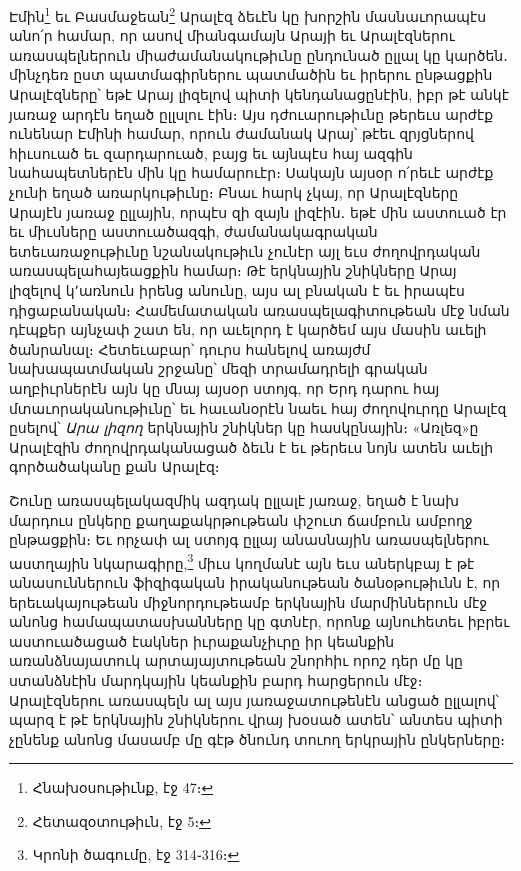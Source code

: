 \documentclass{article}
\begin{document}
{Էմին\footnote{Հնախօսութիւնք, էջ 47։} եւ Բասմաջեան\footnote{Հետազօտութիւն, էջ 5։} Արալէզ ձեւէն կը խորշին մասնաւորապէս անո՛ր համար, որ ասով միանգամայն Արայի եւ Արալէզներու առասպելներուն միաժամանակութիւնը ընդունած ըլլալ կը կարծեն․ մինչդեռ ըստ պատմագիրներու պատմածին եւ իրերու ընթացքին Արալէզները՝ եթէ Արայ լիզելով պիտի կենդանացընէին, իբր թէ անկէ յառաջ արդէն եղած ըլլսլու էին։ Այս դժուարութիւնը թերեւս արժէք ունենար Էմինի համար, որուն ժամանակ Արայ՝ թէեւ զրյցներով հիւսուած եւ զարդարուած, բայց եւ այնպէս հայ ազգին նահապետներէն մին կը համարուէր։ Սակայն այսօր ո՛րեւէ արժէք չունի եղած առարկութիւնը։ Բնաւ հարկ չկայ, որ Արալէզները Արայէն յառաջ ըլլային, որպէս զի զայն լիզէին․ եթէ մին աստուած էր եւ միւսները աստուածազգի, ժամանակագրական ետեւառաջութիւնը նշանակութիւն չունէր այլ եւս ժողովրդական առասպելահայեացքին համար։ Թէ երկնային շնիկները Արայ լիզելով կ՚առնուն իրենց անունը, այս ալ բնական է եւ իրապէս դիցաբանական։ Համեմատական առասպելագիտութեան մէջ նման դէպքեր այնչափ շատ են, որ աւելորդ է կարծեմ այս մասին աւելի ծանրանալ։ Հետեւաբար՝ դուրս հանելով առայժմ նախապատմական շրջանը՝ մեզի տրամադրելի գրական աղբիւրներէն այն կը մնայ այսօր ստոյգ, որ Երդ դարու հայ մտաւորականութիւնը՝ եւ հաւանօրէն նաեւ հայ ժողովուրդը Արալէզ ըսելով՝ \emph{Արա լիզող} երկնային շնիկներ կը հասկընային։ «Առլեզ»ը Արալէզին ժողովրդականացած ձեւն է եւ թերեւս նոյն ատեն աւելի գործածականը քան Արալէզ։

Շունը առասպելակազմիկ ազդակ ըլլալէ յառաջ, եղած է նախ մարդուս ընկերը քաղաքակրթութեան փշուտ ճամբուն ամբողջ ընթացքին։ Եւ որչափ ալ ստոյգ ըլլայ անասնային առասպելներու աստղային նկարագիրը,\footnote{Կրոնի ծագումը, էջ 314֊316։} միւս կողմանէ այն եւս աներկբայ է թէ անասուններուն ֆիզիգական իրականութեան ծանօթութիւնն է, որ երեւակայութեան միջնորդութեամբ երկնային մարմիններուն մէջ անոնց համապատասխանները կը գտնէր, որոնք այնուհետեւ իբրեւ աստուածացած էակներ իւրաքանչիւրը իր կեանքին առանձնայատուկ արտայայտութեան շնորհիւ որոշ դեր մը կը ստանձնէին մարդկային կեանքին բարդ հարցերուն մէջ։ Արալէզներու առասպելն ալ այս յառաջատութենէն անցած ըլլալով՝ պարզ է թէ երկնային շնիկներու վրայ խօսած ատեն՝ անտես պիտի չընենք անոնց մասամբ մը գէթ ծնունդ տուող երկրային ընկերները։

}
\end{document}
